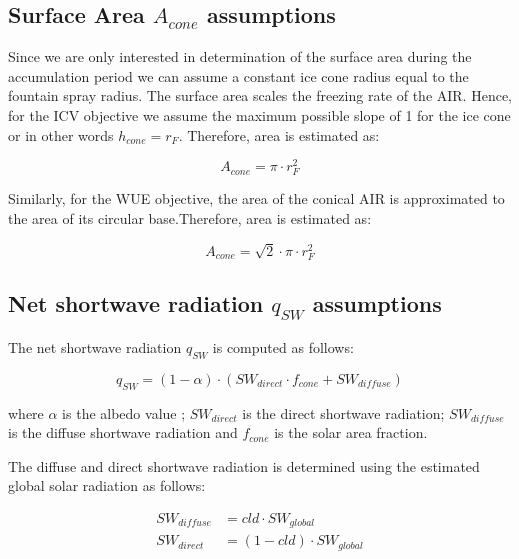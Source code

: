 \documentclass[tc, manuscript]{copernicus}
\begin{document}
\subsection{Surface Area $A_{cone}$ assumptions}

Since we are only interested in determination of the surface area during the accumulation period we can assume a
constant ice cone radius equal to the fountain spray radius. The surface area scales the freezing rate of the
AIR. Hence, for the ICV objective we assume the maximum possible slope of 1 for the ice cone or in other words
$h_{cone} = r_{F}$. Therefore, area is estimated as:  

\begin{equation} A_{cone} =\pi \cdot r_{F}^2 \label{eq:Area} \end{equation}

Similarly, for the WUE objective, the area of the conical AIR is approximated to the area of its circular
base.Therefore, area is estimated as:

\begin{equation} A_{cone} =\sqrt{2} \cdot \pi \cdot r_{F}^2 \label{eq:Area} \end{equation}

\subsection{Net shortwave radiation \texorpdfstring{$q_{SW}$}{Lg} assumptions}
\label{sec:SW}

The net shortwave radiation $q_{SW}$ is computed as follows:

\begin{equation} 
q_{SW} = (1- \alpha) \cdot ( SW_{direct} \cdot f_{cone} + SW_{diffuse})
\label{eqn:SW} 
\end{equation}

where $\alpha$ is the albedo value ; $SW_{direct}$ is the direct shortwave radiation; $SW_{diffuse}$ is the
diffuse shortwave radiation and $f_{cone}$ is the solar area fraction.

The diffuse and direct shortwave radiation is determined using the estimated global solar radiation as follows:

\begin{equation}
\begin{split}
  SW_{diffuse} &= cld \cdot SW_{global}\\
  SW_{direct} &= (1-cld) \cdot SW_{global}
\end{split}
\end{equation}
\end{document}
